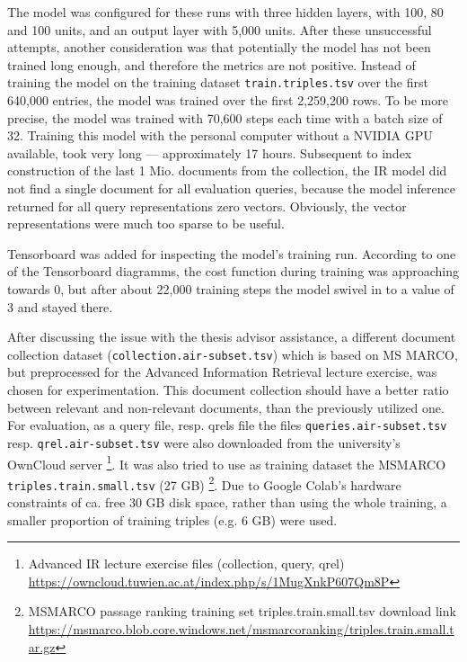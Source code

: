 The model was configured for these runs with three hidden layers, with 100, 80 and 100 units,
    and an output layer with 5,000 units.
After these unsuccessful attempts, another consideration was that potentially the model has not been trained
    long enough, and therefore the metrics are not positive.
Instead of training the model on the training dataset \verb|train.triples.tsv| over the first 640,000 entries,
    the model was trained over the first 2,259,200 rows.
To be more precise, the model was trained with 70,600 steps each time with a batch size of 32.
Training this model with the personal computer without a NVIDIA GPU available, took very long --- 
    approximately 17 hours.
Subsequent to index construction of the last 1 Mio. documents from the collection,
    the IR model did not find a single document for all evaluation queries,
    because the model inference returned for all query representations zero vectors.
Obviously, the vector representations were much too sparse to be useful.


Tensorboard was added for inspecting the model's training run.
According to one of the Tensorboard diagramms, the cost function during training
    was approaching towards 0, but after about 22,000 training steps the model
    swivel in to a value of 3 and stayed there.

After discussing the issue with the thesis advisor assistance, 
    a different document collection dataset (\verb|collection.air-subset.tsv|) 
    which is based on MS MARCO, but preprocessed for the Advanced Information Retrieval 
    lecture exercise, was chosen for experimentation.
This document collection should have a better ratio between relevant and non-relevant documents,
    than the previously utilized one.
For evaluation, as a query file, resp. qrels file the files \verb|queries.air-subset.tsv| resp.
    \verb|qrel.air-subset.tsv| were also downloaded from the university's OwnCloud server 
    \footnote{Advanced IR lecture exercise files (collection, query, qrel) \url{https://owncloud.tuwien.ac.at/index.php/s/1MugXnkP607Qm8P}}.
It was also tried to use as training dataset the MSMARCO \verb|triples.train.small.tsv| (27 GB)
    \footnote{MSMARCO passage ranking training set triples.train.small.tsv download link \url{https://msmarco.blob.core.windows.net/msmarcoranking/triples.train.small.tar.gz}}.
Due to Google Colab's hardware constraints of ca. free 30 GB disk space, rather than using the whole training,
    a smaller proportion of training triples (e.g. 6 GB) were used.

